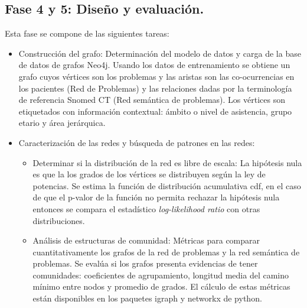 \subsection{Fase 4 y 5: Diseño y evaluación.} \label{par:disenho_evaluacion} Esta fase se compone de las siguientes tareas:
\begin{itemize}
\item Construcción del grafo: Determinación del modelo de datos y carga de la base de datos de grafos Neo4j. Usando los datos de entrenamiento se obtiene un grafo cuyos vértices son los problemas y las aristas son las co-ocurrencias en los pacientes (Red de Problemas) y las relaciones dadas por la terminología de referencia Snomed CT (Red semántica de problemas). Los vértices son etiquetados con información contextual: ámbito o nivel de asistencia, grupo etario y área jerárquica.  

\item Caracterización de las redes y búsqueda de patrones en las redes:
\begin{itemize}
\item Determinar si la distribución de la red es libre de escala: La hipótesis nula es que la los grados de los vértices se distribuyen según la ley de potencias. Se estima la función de distribución acumulativa \acrshort{cdf}, en el caso de que el p-valor de la función no permita rechazar la hipótesis nula entonces se compara el estadístico \textit{log-likelihood ratio} con otras distribuciones.
\item Análisis de estructuras de comunidad: Métricas para comparar cuantitativamente los grafos de la red de problemas y la red semántica de problemas. Se evalúa si los grafos presenta evidencias de tener comunidades: coeficientes de agrupamiento, longitud media del camino mínimo entre nodos y promedio de grados. El cálculo de estas métricas están disponibles en los paquetes igraph\cite{igraph} y networkx\cite{SciPyProceedings_11} de python.
\end{itemize}


\end{itemize}
